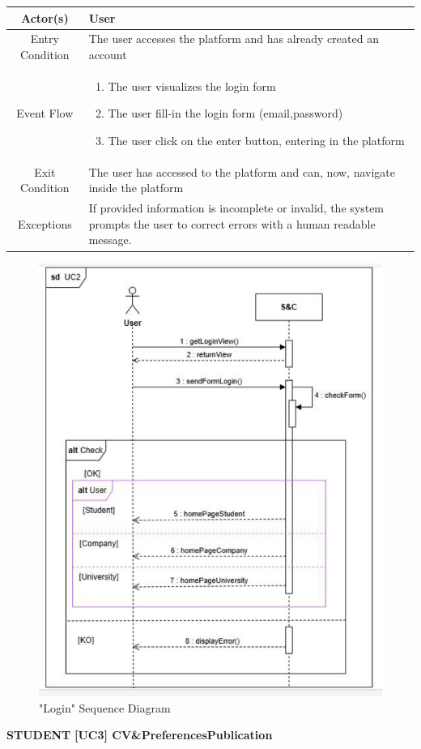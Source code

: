 \documentclass{article}
\begin{document}
\begin{table}[H]
    \centering
    \begin{tabular}{|c|p{10cm}|}
    \hline
        Actor(s)  & User\\ 
    \hline
        Entry Condition &  
        The user accesses the platform and has already created an account\\
    \hline
        Event Flow &
        \begin{enumerate}
            \item The user visualizes the login form
            \item The user fill-in the login form (email,password)
            \item The user click on the enter button, entering in the platform
        \end{enumerate}
        \\
    \hline
        Exit Condition & The user has accessed to the platform and can, now, navigate inside the platform\\
    \hline
        Exceptions &  If provided information is incomplete or invalid, the system prompts the user to correct errors with a human readable message.\\
    \hline
    \end{tabular}
    \label{tab:my_label}
\end{table}
\begin{figure}[H]
    \centering
    \includegraphics[width=0.8\linewidth]{sequenceDiagrams/UC2.png}
    \caption{"Login" Sequence Diagram}
    \label{fig:enter-label}
\end{figure}
\textbf{STUDENT}\newline\newline
\textbf{[UC3] CV\&PreferencesPublication}
\end{document}
